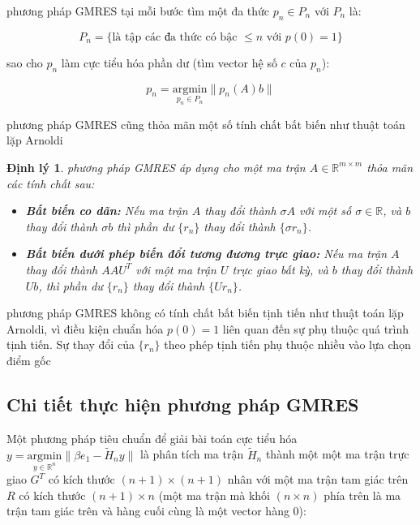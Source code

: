 \documentclass[14pt, a4paper]{article}
\numberwithin{equation}{section}
\numberwithin{algorithm}{section}
\numberwithin{figure}{section}
\newtheorem{dl}{Định lý}
\numberwithin{dl}{section}
\numberwithin{md}{section}
\numberwithin{bd}{section}
\numberwithin{dn}{section}
\begin{document}
phương pháp GMRES tại mỗi bước tìm một đa thức $p_n \in P_n$ với $P_n$ là:

\begin{equation}
    P_n = \lbrace \text{là tập các đa thức có bậc } \leq n \text{ với } p(0)=1 \rbrace
\end{equation}

sao cho $p_n$ làm cực tiểu hóa phần dư (tìm vector hệ số $c$ của $p_n$):

\begin{equation} \label{eq:Find-Polynomial}
    p_n = \underset{p_n \in P_n}{\mathrm{argmin}} \lVert p_n(A)b \rVert
\end{equation}

phương pháp GMRES cũng thỏa mãn một số tính chất bất biến như thuật toán lặp Arnoldi

\begin{dl}
    phương pháp GMRES áp dụng cho một ma trận $A \in \mathbb{R}^{m \times m}$ thỏa mãn các tính chất sau:

    \begin{itemize}
        \item \textbf{Bất biến co dãn:} Nếu ma trận $A$ thay đổi thành $\sigma A$ với một số $\sigma \in \mathbb{R}$, và $b$ thay đổi thành $\sigma b$ thì phần dư $\lbrace r_n \rbrace$ thay đổi thành $\lbrace \sigma r_n \rbrace$.
        \item \textbf{Bất biến dưới phép biến đổi tương đương trực giao:} Nếu ma trận $A$ thay đổi thành $A A U^T$ với một ma trận $U$ trực giao bất kỳ, và $b$ thay đổi thành $Ub$, thì phần dư $\lbrace r_n \rbrace$ thay đổi thành $\lbrace U r_n \rbrace$.
    \end{itemize}
\end{dl}

phương pháp GMRES không có tính chất bất biến tịnh tiến như thuật toán lặp Arnoldi, vì điều kiện chuẩn hóa $p(0)=1$ liên quan đến sự phụ thuộc quá trình tịnh tiến. Sự thay đổi của $\lbrace r_n \rbrace$ theo phép tịnh tiến phụ thuộc nhiều vào lựa chọn điểm gốc

\subsection{Chi tiết thực hiện phương pháp GMRES}

Một phương pháp tiêu chuẩn để giải bài toán cực tiểu hóa $y = \underset{y \in \mathbb{R}^{n}}{\mathrm{argmin}} \lVert \beta e_1 - \widetilde{H}_n y \rVert$ là phân tích ma trận $\widetilde{H}_n$ thành một một ma trận trực giao $G^T$ có kích thước $(n+1) \times (n+1)$ nhân với một ma trận tam giác trên $R$ có kích thước $(n+1) \times n$ (một ma trận mà khối $(n \times n)$ phía trên là ma trận tam giác trên và hàng cuối cùng là một vector hàng 0):
\end{document}
